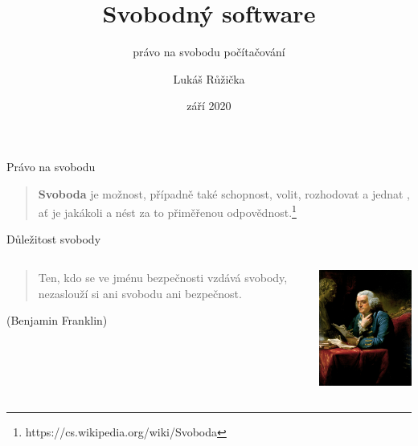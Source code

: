 \documentclass[11pt]{beamer}
\begin{document}
	\author{Lukáš Růžička}
	\title{Svobodný software}
	\subtitle{právo na svobodu počítačování}
	\date{září 2020}
	\begin{frame}[plain]
		\maketitle
	\end{frame}

	\begin{frame}{Právo na svobodu}
		\begin{quote}
			\textbf{Svoboda} je možnost, případně také schopnost, volit, rozhodovat a jednat , ať je jakákoli a nést za to přiměřenou odpovědnost.\footnote{https://cs.wikipedia.org/wiki/Svoboda} 
		\end{quote}
	\end{frame}
	
	\begin{frame}{Důležitost svobody}
	\begin{columns}
		\begin{column}{0.5\textwidth}
			\begin{quote}
				Ten, kdo se ve jménu bezpečnosti vzdává svobody, nezaslouží si ani svobodu ani bezpečnost.
			\end{quote}
			\begin{flushright}
				(Benjamin Franklin)
			\end{flushright}
		\end{column}
		\begin{column}{0.5\textwidth}
			\includegraphics[width=5cm]{images/franklin.jpg}
		\end{column}
	\end{columns}
	\end{frame}
\end{document}
